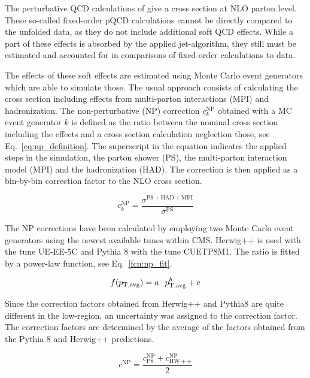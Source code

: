 The perturbative QCD calculations of \NLOJETPP give a cross section at NLO
parton level. These so-called fixed-order pQCD calculations cannot be directly
compared to the unfolded data, as they do not include additional soft QCD
effects. While a part of these effects is absorbed by the applied jet-algorithm,
they still must be estimated and accounted for in comparisons of fixed-order
calculations to data.

The effects of these soft effects are estimated using Monte Carlo event
generators which are able to simulate those. The usual approach consists of
calculating the cross section including effects from multi-parton interactions
(MPI) and hadronization. The non-perturbative (NP) correction $c_k^\mathrm{NP}$
obtained with a MC event generator $k$ is defined as the ratio between the
nominal cross section including the effects and a cross section calculation
neglection those, see Eq.~\ref{eq:np_definition}. The superscript in the
equation indicates the applied steps in the simulation, the parton shower (PS),
the multi-parton interaction model (MPI) and the hadronization (HAD). The
correction is then applied as a bin-by-bin correction factor to the NLO cross
section.

\begin{equation}
    c_{k}^{\mathrm{NP}} = \frac{\sigma^{\mathrm{PS+HAD+MPI}}}{\sigma^{\mathrm{PS}}}
    \label{eq:np_definition}
\end{equation}

The NP corrections have been calculated by employing two Monte Carlo
event generators using the newest available tunes within CMS. Herwig++ is used
with the tune UE-EE-5C and Pythia 8 with the tune CUETP8M1. The ratio is fitted
by a power-law function, see Eq.~\ref{fcn:np_fit}.

\begin{equation}
  f(p_{\mathrm{T,avg}}) = a \cdot p_{\mathrm{T,avg}}^b + c
  \label{fcn:np_fit}
\end{equation}

Since the correction factors obtained from Herwig++ and Pythia8 are quite
different in the low-\pt region, an uncertainty was assigned to the correction
factor. The correction factors are determined by the average of the factors
obtained from the Pythia 8 and Herwig++ predictions.

\begin{equation*}
    c^\mathrm{NP} = \frac{c_{\mathrm{P8}}^{\mathrm{NP}} + c_{\mathrm{HW++}}^{\mathrm{NP}}}{2}
\end{equation*}

